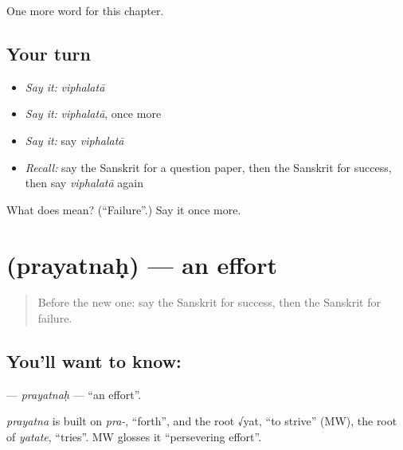 \begin{grammarlens}[title={What you've built}]
One more word for this chapter.
\end{grammarlens}

\subsection*{Your turn}
\begin{itemize}
\raggedright
  \item \emph{Say it:} \emph{viphalatā}
  \item \emph{Say it:} \emph{viphalatā}, once more
  \item \emph{Say it:} say \emph{viphalatā}
  \item \emph{Recall:} say the Sanskrit for a question paper, then the Sanskrit for success, then say \emph{viphalatā} again
\end{itemize}

\begin{tcolorbox}[breakable,colback=teal!4,colframe=teal!35!black,title={Before you move on}]
What does  mean? (\textquotedblleft{}Failure\textquotedblright{}.) Say it once more.
\end{tcolorbox}
\section[\texorpdfstring{\sk{प्रयत्नः} (prayatnaḥ)}{प्रयत्नः (prayatnaḥ)}]{ (prayatnaḥ) — an effort}

\label{lesson:SA-C230-prayatnah}



\begin{quote}
Before the new one: say the Sanskrit for success, then the Sanskrit for failure.
\end{quote}

\subsection*{You'll want to know: }
\textbf{} — \emph{prayatnaḥ} — \textquotedblleft{}an effort\textquotedblright{}.

\begin{cousinweb}
\emph{prayatna} is built on \emph{pra-}, \textquotedblleft{}forth\textquotedblright{}, and the root √yat, \textquotedblleft{}to strive\textquotedblright{} (MW), the root of \emph{yatate}, \textquotedblleft{}tries\textquotedblright{}. MW glosses it \textquotedblleft{}persevering effort\textquotedblright{}.
\end{cousinweb}

